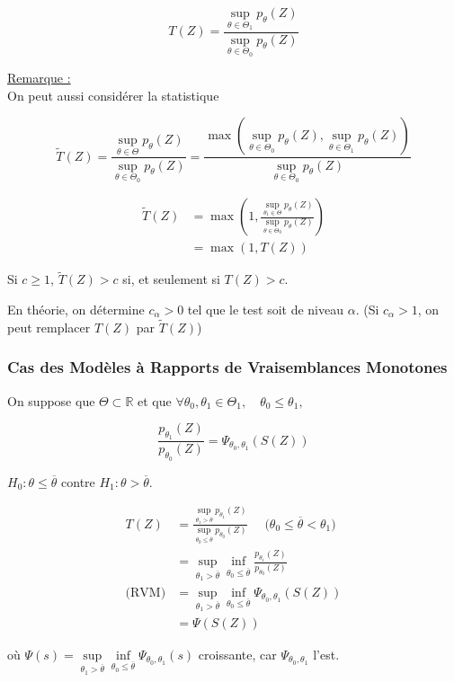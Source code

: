 \documentclass[12pt]{article}
\newcommand{\petitespace}{\vspace{0.5cm}}
\newcommand{\bb}[1]{\mathbb{#1}} %
\newcommand{\R}{\bb{R}} %
\newcommand{\Rq}{\underline{Remarque :} \\}
\newcommand{\Sup}[1]{\sup\limits_{#1}}%
\newcommand{\Inf}[1]{\inf\limits_{#1}}
\newcommand{\1}{\bb{1}} %
\begin{document}
$$T(Z) = \frac{\Sup{\theta \in \Theta_1}p_\theta(Z)}{\Sup{\theta \in \Theta_0}p_\theta(Z)} $$


\Rq 

On peut aussi considérer la statistique 

$$\widetilde T(Z) = \frac{\Sup{\theta \in \Theta}p_\theta(Z)}{\Sup{\theta \in \Theta_0}p_\theta(Z)} = \frac{\max(\Sup{\theta \in \Theta_0}p_\theta(Z), \Sup{\theta \in \Theta_1}p_\theta(Z))}{\Sup{\theta \in \Theta_0}p_\theta(Z)} $$ 

\begin{align*}
	\widetilde T(Z) &= \max(1, \frac{\Sup{\theta_1 \in \Theta}p_\theta(Z)}{\Sup{\theta \in \Theta_0}p_\theta(Z)})\\
	&=\max(1, T(Z))
\end{align*}

Si $c \ge 1$, $\widetilde T(Z)>c$ si, et seulement si $T(Z)>c$.\petitespace

En théorie, on détermine $c_\alpha>0$ tel que le test soit de niveau $\alpha$. (Si $c_\alpha>1$, on peut remplacer $T(Z)$ par $\widetilde T(Z)$)

\petitespace

\subsubsection{Cas des Modèles à Rapports de Vraisemblances Monotones}
\petitespace

On suppose que $\Theta \subset \R$ et que $\forall \theta_0, \theta_1 \in \Theta_1,\quad \theta_0 \le \theta_1,$

$$\frac{p_{\theta_1}(Z)}{p_{\theta_0}(Z)} = \Psi_{\theta_0, \theta_1}(S(Z))$$

$H_0 : \theta \le \overline \theta$ contre $H_1 : \theta >\overline \theta$.

\begin{align*}
	T(Z) &=  \frac{\Sup{\theta_1 > \overline\theta}p_{\theta_1}(Z)}{\Sup{\theta_0 \le  \overline\theta}p_{\theta_0}(Z)} \quad \text{ ($\theta_0 \le \overline \theta < \theta_1)$}\\
	&=\Sup{\theta_1>\overline \theta} \Inf{\theta_0 \le \overline \theta}\frac{p_{\theta_1}(Z)}{p_{\theta_0}(Z)}\\
	\text{(RVM)}&= \Sup{\theta_1>\overline \theta} \Inf{\theta_0 \le \overline \theta} \Psi_{\theta_0, \theta_1}(S(Z))\\
	&=\Psi(S(Z))
\end{align*}


où $\Psi(s) = \Sup{\theta_1>\overline \theta} \Inf{\theta_0 \le \overline \theta} \Psi_{\theta_0, \theta_1}(s)$ croissante, car $ \Psi_{\theta_0, \theta_1}$ l'est. \petitespace
\end{document}
